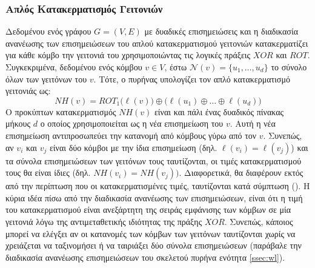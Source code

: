 \subsubsection{Απλός Κατακερματισμός Γειτονιών}
Δεδομένου ενός γράφου $G=(V,E)$ με δυαδικές επισημειώσεις και η διαδικασία ανανέωσης των επισημειώσεων του απλού κατακερματισμού γειτονιών κατακερματίζει για κάθε κόμβο την γειτονιά του χρησιμοποιώντας τις λογικές πράξεις $XOR$ και $ROT$.
Συγκεκριμένα, δεδομένου ενός κόμβου $v \in V$, έστω $\mathcal{N}(v)=\{ u_1,\ldots,u_d \}$ το σύνολο όλων των γειτόνων του $v$.
Τότε, ο πυρήνας υπολογίζει τον απλό κατακερματισμό γειτονιάς ως:
\begin{equation}
    NH(v) = ROT_1 \big( \ell(v) \big) \oplus \big( \ell(u_1) \oplus \ldots \oplus \ell(u_d) \big)
\end{equation}
Ο προκύπτων κατακερματισμός $NH(v)$ είναι και πάλι ένας δυαδικός πίνακας μήκους $d$ ο οποίος χρησιμοποιείται ως η νέα επισημείωση του $v$.
Αυτή η νέα επισημείωση αντιπροσωπεύει την κατανομή από κόμβους γύρω από τον $v$.
Συνεπώς, αν $v_i$ και $v_j$ είναι δύο κόμβοι με την ίδια επισημείωση (δηλ. $\ell(v_i) = \ell(v_j)$) και τα σύνολα επισημειώσεων των γειτόνων τους ταυτίζονται, οι τιμές κατακερματισμού τους θα είναι ίδιες (δηλ. $NH(v_i) = NH(v_j))$.
Διαφορετικά, θα διαφέρουν εκτός από την περίπτωση που οι κατακερματισμένες τιμές, ταυτίζονται κατά σύμπτωση ().
Η κύρια ιδέα πίσω από την διαδικασία ανανέωσης των επισημειώσεων, είναι ότι η τιμή του κατακερματισμού είναι ανεξάρτητη της σειράς εμφάνισης των κόμβων σε μία γειτονιά λόγω της αντιμεταθετικής ιδιότητας της πράξης $XOR$.
Συνεπώς, κάποιος μπορεί να ελέγξει αν οι κατανομές των κόμβων των γειτόνων ταυτίζονται χωρίς να χρειάζεται να ταξινομήσει ή να ταιριάξει δύο σύνολα επισημειώσεων (παράβαλε την διαδικασία ανανέωσης επισημειώσεων του σκελετού πυρήνα  ενότητα \ref{ssec:wl}).

